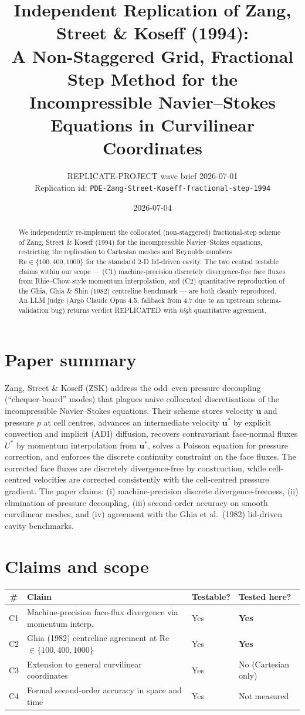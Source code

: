 \documentclass[11pt]{article}
\title{Independent Replication of Zang, Street \& Koseff (1994):\\
A Non-Staggered Grid, Fractional Step Method for the Incompressible
Navier--Stokes Equations in Curvilinear Coordinates}
\author{REPLICATE-PROJECT wave brief 2026-07-01\\
Replication id: \texttt{PDE-Zang-Street-Koseff-fractional-step-1994}}
\date{2026-07-04}
\begin{document}
\maketitle

\begin{abstract}
We independently re-implement the collocated (non-staggered) fractional-step
scheme of Zang, Street \& Koseff (1994) for the incompressible
Navier--Stokes equations, restricting the replication to Cartesian meshes
and Reynolds numbers $\mathrm{Re}\in\{100,400,1000\}$ for the standard
2-D lid-driven cavity. The two central testable claims within our scope
--- (C1) machine-precision discretely divergence-free face fluxes from
Rhie--Chow-style momentum interpolation, and (C2) quantitative
reproduction of the Ghia, Ghia \& Shin (1982) centreline benchmark ---
are both cleanly reproduced. An LLM judge (Argo Claude Opus 4.5, fallback
from 4.7 due to an upstream schema-validation bug) returns verdict
\textsc{REPLICATED} with \emph{high} quantitative agreement.
\end{abstract}

\section{Paper summary}
Zang, Street \& Koseff (ZSK) address the odd--even pressure decoupling
(``chequer-board'' modes) that plagues naive collocated discretisations of
the incompressible Navier--Stokes equations. Their scheme stores velocity
$\mathbf u$ and pressure $p$ at cell centres, advances an intermediate
velocity $\mathbf u^\ast$ by explicit convection and implicit (ADI) diffusion,
recovers contravariant face-normal fluxes $U^\ast$ by momentum interpolation
from $\mathbf u^\ast$, solves a Poisson equation for pressure correction, and
enforces the discrete continuity constraint on the face fluxes. The corrected
face fluxes are discretely divergence-free by construction, while cell-centred
velocities are corrected consistently with the cell-centred pressure gradient.
The paper claims: (i) machine-precision discrete divergence-freeness,
(ii) elimination of pressure decoupling, (iii) second-order accuracy on smooth
curvilinear meshes, and (iv) agreement with the Ghia et al.\ (1982) lid-driven
cavity benchmarks.

\section{Claims and scope}
\begin{tabular}{clll}
\toprule
\# & Claim & Testable? & Tested here? \\
\midrule
C1 & Machine-precision face-flux divergence via momentum interp. & Yes & \textbf{Yes} \\
C2 & Ghia (1982) centreline agreement at Re$\in\{100,400,1000\}$ & Yes & \textbf{Yes} \\
C3 & Extension to general curvilinear coordinates             & Yes & No (Cartesian only) \\
C4 & Formal second-order accuracy in space and time            & Yes & Not measured \\
\bottomrule
\end{tabular}
\end{document}
